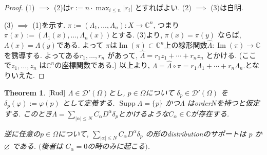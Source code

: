 \documentclass[dvipdfmx,a4paper,11pt]{article} %
\newtheorem{thm}{Theorem}[section]
\theoremstyle{definition}
\theoremstyle{remark}
\numberwithin{equation}{section}
\newcommand{\C}{\mathbb{C}}
\begin{document}
\begin{proof}
(1) \(\implies\) (2)は\(r := n \cdot \max_{i\le n}|r_i|\) とすればよい.  
(2) \(\implies\) (3)は自明.

(3) \(\implies\) (1)を示す. 
\(\pi :=(\Lambda_1,\dots,\Lambda_n): X \to \mathbb{C}^n\), つまり$\pi(x):=(\Lambda_1(x), \dots, \Lambda_n(x))$とする. 
(3)より,  \(\pi(x) = \pi(y)\) ならば,  \(\Lambda(x) = \Lambda(y)\)である.
よって $\pi$は$\operatorname{Im}(\pi)  \subset \C^n$上の線形関数\(\hat{\Lambda} : \operatorname{Im}(\pi)  \to \C \)を誘導する. 
よってある\( r_1,\dots,r_n\) があって, 
\(\hat{\Lambda} = r_1 z_1 + \cdots + r_n z_n\) とかける. (ここで\(z_1,\dots,z_n\) は\(\mathbb{C}^n\)の座標関数である.)
以上より, \( \Lambda = \hat{\Lambda} \circ \pi = r_1 \Lambda_1 + \cdots + r_n \Lambda_n.\)となりいえた. 
\end{proof}


\begin{tcolorbox}[mybox]
\begin{thm}{$\cite[Thm 6.25]{Rud}$}
\label{thm-H-2.2}
\(\Lambda \in \mathcal{D}'(\Omega)\)とし, \(p \in \Omega\)について
\(\delta_p \in \mathcal{D}'(\Omega)\) を\(\delta_p(\varphi) := \varphi(p)\) として定義する. 
\(\operatorname{Supp}\Lambda = \{p\}\) かつ\(\Lambda\) はorder\(N\)を持つと仮定する. 
このとき\(\Lambda = \sum_{|\alpha|\le N} C_\alpha D^\alpha \delta_p\)とかけるような$C_\alpha \in \C$が存在する. 

逆に任意の\(p \in \Omega\)について,  \(\sum_{|\alpha|\le N} C_\alpha D^\alpha \delta_p\)  
の形のdistributionのサポートは \(p\) か \(\varnothing\) である. $($後者は \(C_\alpha = 0\)の時のみに起こる$)$.  
\end{thm}
\end{tcolorbox}
\end{document}
